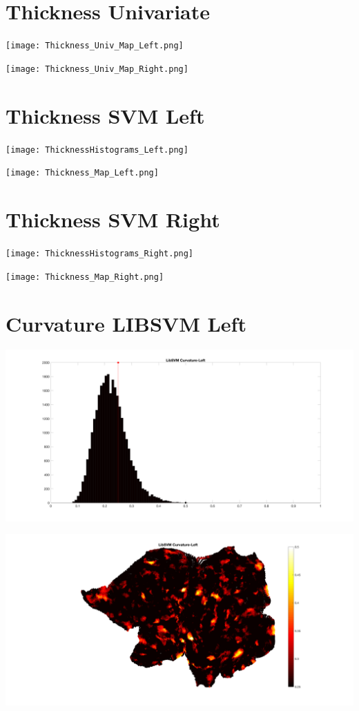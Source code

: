 \documentclass[]{article}
\begin{document}
\section{Thickness Univariate}
\centerline{\texttt{[image: Thickness\_Univ\_Map\_Left.png]}}
\centerline{\texttt{[image: Thickness\_Univ\_Map\_Right.png]}}

\newpage
\section{Thickness SVM Left}
\centerline{\texttt{[image: ThicknessHistograms\_Left.png]}}
\centerline{\texttt{[image: Thickness\_Map\_Left.png]}}

\newpage
\section{Thickness SVM Right}
\centerline{\texttt{[image: ThicknessHistograms\_Right.png]}}
\centerline{\texttt{[image: Thickness\_Map\_Right.png]}}

\newpage
\section{Curvature LIBSVM Left}
\centerline{\includegraphics[width=1.2\textwidth]{Curvature_LibSVM_Histograms_Left.png}}
\centerline{\includegraphics[width=1.2\textwidth]{Curvature_LibSVM_Map_Left.png}}
\newpage
\end{document}
